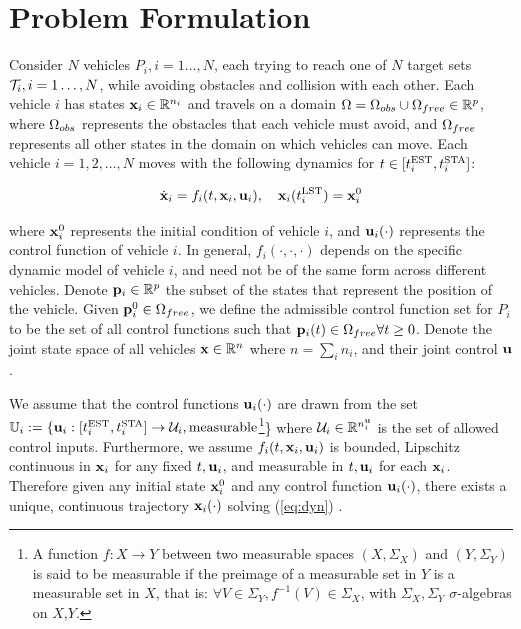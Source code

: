\section{Problem Formulation \label{sec:formulation}}
Consider $N$ vehicles $P_i,i=1\ldots,N$, each trying to reach one of $N$ target sets $\mathcal{T}_i,i=1\ldots,N$, while avoiding obstacles and collision with each other. Each vehicle $i$ has states $\mathbf{x}_i\in \mathbb{R}^{n_i}$ and travels on a domain $\Omega=\Omega_{obs} \cup \Omega_{free}\in\mathbb{R}^p$, where $\Omega_{obs}$ represents the obstacles that each vehicle must avoid, and $\Omega_{free}$ represents all other states in the domain on which vehicles can move. Each vehicle $i = 1,2,\ldots,N$ moves with the following dynamics for $t\in[t^{\text{EST}}_i, t^{\text{STA}}_i]$:

\begin{equation} \label{eq:dyn}
\dot{\mathbf{x}}_i = f_i (t, \mathbf{x}_i, \mathbf{u}_i), \quad\mathbf{x}_i(t^{\text{LST}}_i) = \mathbf{x}_i^0 
\end{equation}

\noindent where $\mathbf{x}_i^0$ represents the initial condition of vehicle $i$, and $\mathbf{u}_i(\cdot)$ represents the control function of vehicle $i$. In general, $f_i(\cdot,\cdot,\cdot)$ depends on the specific dynamic model of vehicle $i$, and need not be of the same form across different vehicles. Denote $\mathbf{p}_i\in\mathbb{R}^p$ the subset of the states that represent the position of the vehicle. Given $\mathbf{p}_i^0\in\Omega_{free}$, we define the admissible control function set for $P_i$ to be the set of all control functions such that $\mathbf{p}_i(t) \in \Omega_{free} \forall t\ge 0$. Denote the joint state space of all vehicles $\mathbf{x} \in \mathbb{R}^n$ where $n = \sum_i n_i$, and their joint control $\mathbf{u}$.

We assume that the control functions $\mathbf{u}_i(\cdot)$ are drawn from the set $\mathbb{U}_i := \{\mathbf{u}_i: [t^{\text{EST}}_i, t^{\text{STA}}_i] \rightarrow \mathcal{U}_i, \text{measurable}$\footnote{
A function $f:X\to Y$ between two measurable spaces $(X,\Sigma_X)$ and $(Y,\Sigma_Y)$ is said to be measurable if the preimage of a measurable set in $Y$ is a measurable set in $X$, that is: $\forall V\in\Sigma_Y, f^{-1}(V)\in\Sigma_X$, with $\Sigma_X,\Sigma_Y$ $\sigma$-algebras on $X$,$Y$.}\} where $\mathcal{U}_i \in \mathbb{R}^{n^{\mathbf{u}}_i}$ is the set of allowed control inputs. Furthermore, we assume $f_i(t,\mathbf{x}_i, \mathbf{u}_i)$ is bounded, Lipschitz continuous in $\mathbf{x}_i$ for any fixed $t,\mathbf{u}_i$, and measurable in $t, \mathbf{u}_i$ for each $\mathbf{x}_i$. Therefore given any initial state $\mathbf{x}_i^0$ and any control function $\mathbf{u}_i(\cdot)$, there exists a unique, continuous trajectory $\mathbf{x}_i(\cdot)$ solving (\ref{eq:dyn}) \cite{coddington55}.

